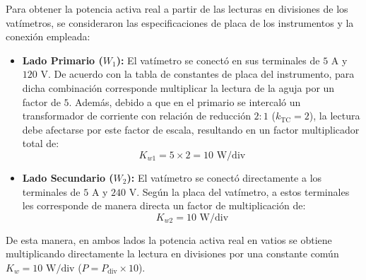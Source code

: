 Para obtener la potencia activa real a partir de las lecturas en divisiones de los vatímetros, se consideraron las especificaciones de placa de los instrumentos y la conexión empleada:
\begin{itemize}
    \item \textbf{Lado Primario ($W_1$):} El vatímetro se conectó en sus terminales de $5\text{ A}$ y $120\text{ V}$. De acuerdo con la tabla de constantes de placa del instrumento, para dicha combinación corresponde multiplicar la lectura de la aguja por un factor de $5$. Además, debido a que en el primario se intercaló un transformador de corriente con relación de reducción $2:1$ ($k_{\text{TC}} = 2$), la lectura debe afectarse por este factor de escala, resultando en un factor multiplicador total de:
    \begin{equation}
        K_{w1} = 5 \times 2 = 10\text{ W/div}
        \label{eq:kw1}
    \end{equation}
    
    \item \textbf{Lado Secundario ($W_2$):} El vatímetro se conectó directamente a los terminales de $5\text{ A}$ y $240\text{ V}$. Según la placa del vatímetro, a estos terminales les corresponde de manera directa un factor de multiplicación de:
    \begin{equation}
        K_{w2} = 10\text{ W/div}
        \label{eq:kw2}
    \end{equation}
\end{itemize}

De esta manera, en ambos lados la potencia activa real en vatios se obtiene multiplicando directamente la lectura en divisiones por una constante común $K_w = 10\text{ W/div}$ ($P = P_{\text{div}} \times 10$).

